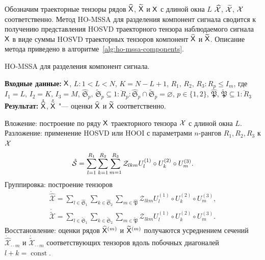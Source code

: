 \documentclass[specialist,
  substylefile=spbu_report.rtx,
subf,href,colorlinks=true, 12pt]{disser}
\theoremstyle{plain}
\theoremstyle{definition}
\theoremstyle{remark}
\newcommand{\Input}{\textbf{Входные данные: }}
\newcommand{\Output}{\textbf{Результат: }}
\begin{document}
Обозначим траекторные тензоры рядов $\widehat{\mathsf{X}}$,
$\widetilde{\mathsf{X}}$ и $\mathsf{X}$ с длиной окна $L$
$\widehat{\mathcal{X}}$, $\widetilde{\mathcal{X}}$, $\mathcal{X}$ соответственно.
Метод HO-MSSA для разделения компонент сигнала сводится к
получению представления HOSVD траекторного тензора
наблюдаемого сигнала $\mathsf{X}$ в виде суммы HOSVD траекторных тензоров
компонент $\widehat{\mathsf{X}}$ и $\widetilde{\mathsf{X}}$.
Описание метода приведено в алгоритме~\ref{alg:ho-mssa-components}.
\begin{algorithm}[!ht]
  \caption{HO-MSSA для разделения компонент сигнала.}
  \label{alg:ho-mssa-components}
  \Input $\mathsf{X}$,
  $L: 1< L < N$, $K = N - L + 1$,
  $R_1$, $R_2$, $R_3: R_p \leqslant I_m$, где $I_1=L$, $I_2=K$, $I_3=M$,
  $\widehat{\mathfrak{S}}_p,\, \widetilde{\mathfrak{S}}_p \subseteq
  \overline{1:R_p}:
  \widehat{\mathfrak{S}}_p \cap \widetilde{\mathfrak{S}}_p = \varnothing$,
  $p \in \{1, 2\}$,
  $\widehat{\mathfrak{P}},\, \widetilde{\mathfrak{P}}  \subseteq
  \overline{1:R_3}$\\
  \Output $\mathring{\widehat{\mathsf{X}}}$, $\mathring{\widetilde{\mathsf{X}}}$
  "--- оценки $\widehat{\mathsf{X}}$ и $\widetilde{\mathsf{X}}$
  соответственно.
  \begin{algorithmic}[1]
    \State Вложение: построение по ряду $\mathsf{X}$ траекторного тензора $\mathcal{X}$
    с длиной окна $L$. \label{algstep:ho-mssa-inj}
    \State Разложение: применение HOSVD или HOOI с параметрами
    $n$-рангов $R_1, R_2, R_3$ к $\mathcal{X}$
    \label{algstep:ho-mssa-decomp}
    \begin{equation*}
      \mathring{\mathcal{S}} = \sum_{l=1}^{R_1} \sum_{k=1}^{R_2} \sum_{m=1}^{R_3}
      \mathcal{Z}_{lkm} U_l^{(1)}\circ U_k^{(2)} \circ U_m^{(3)}.
      \label{eq:ho-mssa}
    \end{equation*}
    \State Группировка: построение тензоров
    \begin{gather*}
      \mathring{\widehat{\mathcal{X}}}=\sum_{l \in \widehat{\mathfrak{S}}_1}
      \sum_{k\in \widehat{\mathfrak{S}}_2}
      \sum_{m\in \widehat{\mathfrak{P}}}
      \mathcal{Z}_{lkm} U^{(1)}_{l}\circ U^{(2)}_{k} \circ U^{(3)}_{m},\\
      \mathring{\widetilde{\mathcal{X}}}=\sum_{l \in \widetilde{\mathfrak{S}}_1}
      \sum_{k\in \widetilde{\mathfrak{S}}_2}
      \sum_{m\in \widetilde{\mathfrak{P}}}
      \mathcal{Z}_{lkm} U^{(1)}_{l}\circ U^{(2)}_{k} \circ U^{(3)}_{m}.
    \end{gather*}
    \State %
    Восстановление: оценки рядов $\widehat{\mathsf{X}}^{(m)}$ и
    $\widetilde{\mathsf{X}}^{(m)}$ получаются усреднением сечений
    $\mathring{\widehat{\mathcal{X}}}_{\cdot \cdot m}$
    и $\mathring{\widetilde{\mathcal{X}}}_{\cdot\cdot m}$ соответствующих
    тензоров вдоль побочных диагоналей $l+k = \operatorname{const}$.
  \end{algorithmic}
\end{algorithm}
\end{document}
